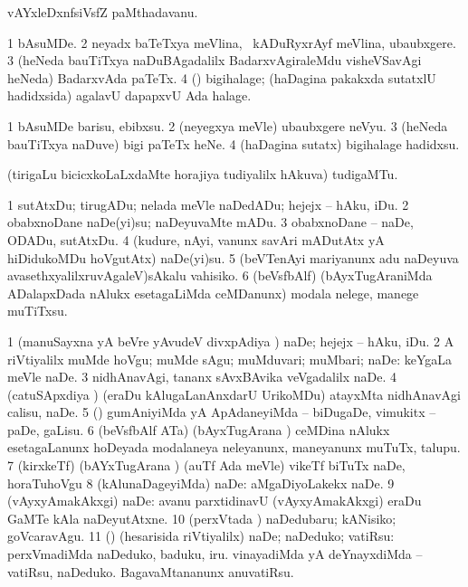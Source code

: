 \bentry
{} 
\gl{\nA}
\expl{}
\bmng
vAYxleDxnfsiVsfZ paMthadavanu. 
\emng
\eentry

\bentry
{} 
\gl{\nA}
\expl{}
\bmng
\bnum
\num{1} bAsuMDe. 
\num{2} neyadx baTeTxya meVlina, \udA\ kADuRyxrAyf meVlina, ubaubxgere. 
\num{3} (heNeda bauTiTxya naDuBAgadalilx BadarxvAgiraleMdu visheVSavAgi heNeda) BadarxvAda paTeTx. 
\num{4} (\nw) bigihalage; (haDagina pakakxda sutatxlU hadidxsida) agalavU dapapxvU Ada halage. 
\enum
\emng
\eentry

\bentry
{} 
\gl{\sakirx}
\expl{}
\bmng
\bnum
\num{1} bAsuMDe barisu, ebibxsu. 
\num{2} (neyegxya meVle) ubaubxgere neVyu. 
\num{3} (heNeda bauTiTxya naDuve) bigi paTeTx heNe. 
\num{4} (haDagina sutatx) bigihalage hadidxsu. 
\enum
\emng
\eentry

\bentry
{} 
\gl{\nA}
\expl{}
\bmng
(tirigaLu bicicxkoLaLxdaMte horajiya tudiyalilx hAkuva) tudigaMTu. 
\emng
\eentry

\bentry
{} 
\gl{\sakirx}
\expl{}
\bmng
\bnum
\num{1} sutAtxDu; tirugADu; nelada meVle naDedADu; hejejx -- hAku, iDu. 
\num{2} obabxnoDane naDe(yi)su; naDeyuvaMte mADu. 
\num{3} obabxnoDane -- naDe, ODADu, sutAtxDu. 
\num{4} (kudure, nAyi, \mo vanunx savAri mADutAtx yA hiDidukoMDu hoVgutAtx) naDe(yi)su. 
\num{5} (beVTenAyi mariyanunx adu naDeyuva avasethxyalilxruvAgaleV)sAkalu vahisiko. 
\num{6} (beVsfbAlf) (bAyxTugAraniMda ADalapxDada nAlukx esetagaLiMda ceMDanunx) modala nelege, manege muTiTxsu. 
\enum
\emng

\noindent
\gl{\akirx}
\expl{}
\bmng
\bnum
\num{1} (manuSayxna yA beVre yAvudeV divxpAdiya \vi) naDe; hejejx -- hAku, iDu. 
\num{2} A riVtiyalilx muMde hoVgu; muMde sAgu; muMduvari; muMbari; naDe:  keYgaLa meVle naDe. 
\num{3} nidhAnavAgi, tananx sAvxBAvika veVgadalilx naDe. 
\num{4} (catuSApxdiya \vi) (eraDu kAlugaLanAnxdarU UrikoMDu) atayxMta nidhAnavAgi calisu, naDe. 
\num{5} (\ame) gumAniyiMda yA ApAdaneyiMda -- biDugaDe, vimukitx -- paDe, gaLisu. 
\num{6} (beVsfbAlf ATa) (bAyxTugArana \vi) ceMDina nAlukx esetagaLanunx hoDeyada modalaneya neleyanunx, maneyanunx muTuTx, talupu. 
\num{7} (kirxkeTf) (bAYxTugArana \vi) (auTf Ada meVle) vikeTf biTuTx naDe, horaTuhoVgu 
\num{8} (kAlunaDageyiMda) naDe:  aMgaDiyoLakekx naDe. 
\num{9} (vAyxyAmakAkxgi) naDe:  avanu parxtidinavU (vAyxyAmakAkxgi) eraDu GaMTe kAla naDeyutAtxne. 
\num{10} (perxVtada \vi) naDedubaru; kANisiko; goVcaravAgu. 
\num{11} (\pArxparx) (hesarisida riVtiyalilx) naDe; naDeduko; vatiRsu:  perxVmadiMda naDeduko, baduku, iru.  vinayadiMda yA deYnayxdiMda -- vatiRsu, naDeduko.  BagavaMtananunx anuvatiRsu. 
\enum
\emng

